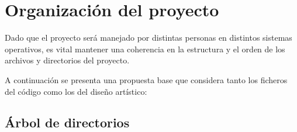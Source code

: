 \section{Organización del proyecto}\label{organizacion:organizacion-del-proyecto}

Dado que el proyecto será manejado por distintas personas en distintos sistemas operativos, es vital mantener una coherencia en la estructura y el orden de los archivos y directorios del proyecto.

A continuación se presenta una propuesta base que considera tanto los ficheros del código como los del diseño artístico:

\subsection{Árbol de directorios}\label{organizacion:arbol-de-directorios}

